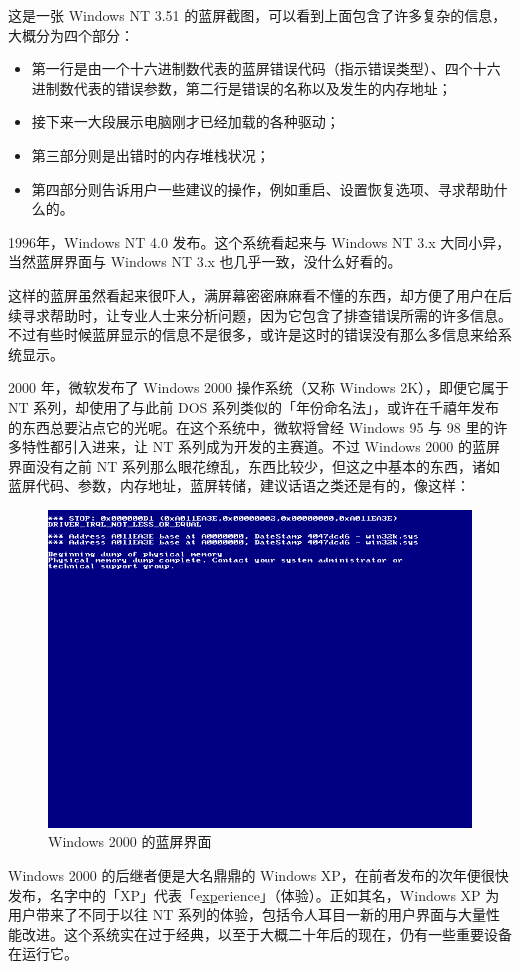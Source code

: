 这是一张 Windows NT 3.51 的蓝屏截图，可以看到上面包含了许多复杂的信息，大概分为四个部分：
\begin{itemize}
  \item 第一行是由一个十六进制数代表的蓝屏错误代码（指示错误类型）、四个十六进制数代表的错误参数，第二行是错误的名称以及发生的内存地址；
  \item 接下来一大段展示电脑刚才已经加载的各种驱动；
  \item 第三部分则是出错时的内存堆栈状况；
  \item 第四部分则告诉用户一些建议的操作，例如重启、设置恢复选项、寻求帮助什么的。
\end{itemize}

1996年，Windows NT 4.0 发布。这个系统看起来与 Windows NT 3.x 大同小异，当然蓝屏界面与 Windows NT 3.x 也几乎一致，没什么好看的。

这样的蓝屏虽然看起来很吓人，满屏幕密密麻麻看不懂的东西，却方便了用户在后续寻求帮助时，让专业人士来分析问题，因为它包含了排查错误所需的许多信息。不过有些时候蓝屏显示的信息不是很多，或许是这时的错误没有那么多信息来给系统显示。

2000 年，微软发布了 Windows 2000 操作系统（又称 Windows 2K），即便它属于 NT 系列，却使用了与此前 DOS 系列类似的「年份命名法」，或许在千禧年发布的东西总要沾点它的光呢。在这个系统中，微软将曾经 Windows 95 与 98 里的许多特性都引入进来，让 NT 系列成为开发的主赛道。不过 Windows 2000 的蓝屏界面没有之前 NT 系列那么眼花缭乱，东西比较少，但这之中基本的东西，诸如蓝屏代码、参数，内存地址，蓝屏转储，建议话语之类还是有的，像这样：

\begin{figure}[htb!]
  \centering
  \includegraphics[width=.7\textwidth]{assets/advanced/Win-2K-BSoD.png}
  \caption{Windows 2000 的蓝屏界面}
  \label{fig:Win-2K-BSoD}
\end{figure}

Windows 2000 的后继者便是大名鼎鼎的 Windows XP，在前者发布的次年便很快发布，名字中的「XP」代表「e\underline{xp}erience」（体验）。正如其名，Windows XP 为用户带来了不同于以往 NT 系列的体验，包括令人耳目一新的用户界面与大量性能改进。这个系统实在过于经典，以至于大概二十年后的现在，仍有一些重要设备在运行它。

